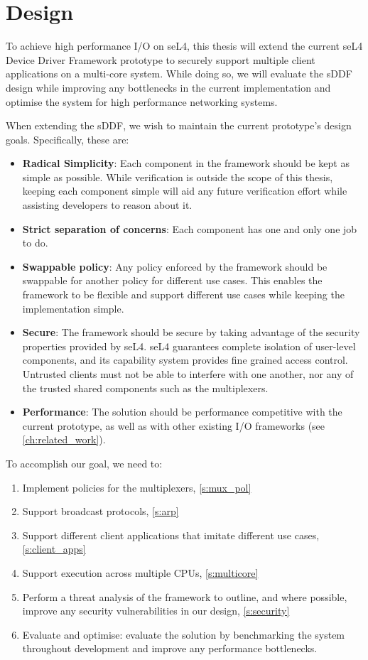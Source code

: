 \chapter{Design}\label{ch:design}

To achieve high performance I/O on seL4, this thesis will extend the current seL4 Device Driver Framework prototype 
to securely support multiple client applications on a multi-core system. While doing so, 
we will evaluate the sDDF design while improving any bottlenecks in the current implementation
and optimise the system for high performance networking systems.

When extending the sDDF, we wish to maintain the current prototype's design goals. 
Specifically, these are:
\begin{itemize}
\item \textbf{Radical Simplicity}: Each component in the framework should be kept as simple as possible. While verification is outside the scope
of this thesis, keeping each component simple will aid any future verification effort while assisting developers to reason about it.
\item \textbf{Strict separation of concerns}: Each component has one and only one job to do. 
\item \textbf{Swappable policy}: Any policy enforced by the framework should be swappable for another policy for different use cases.
This enables the framework to be flexible and support different use cases while keeping the implementation simple.
\item \textbf{Secure}: The framework should be secure by taking advantage of the security properties provided by seL4. seL4 guarantees
complete isolation of user-level components, and its capability system provides fine grained access control. Untrusted clients must not be able
to interfere with one another, nor any of the trusted shared components such as the multiplexers. 
\item \textbf{Performance}: The solution should be performance competitive with the current prototype,
as well as with other existing I/O frameworks (see \autoref{ch:related_work}).
\end{itemize}

\newpage
To accomplish our goal, we need to:
\begin{enumerate}
    \item Implement policies for the multiplexers, \autoref{s:mux_pol}
    \item Support broadcast protocols, \autoref{s:arp}
    \item Support different client applications that imitate different use cases, \autoref{s:client_apps}
    \item Support execution across multiple CPUs, \autoref{s:multicore}
    \item Perform a threat analysis of the framework to outline, and where possible, improve any
         security vulnerabilities in our design, \autoref{s:security}
    \item Evaluate and optimise: evaluate the solution by benchmarking the system throughout development 
    and improve any performance bottlenecks.
\end{enumerate}

